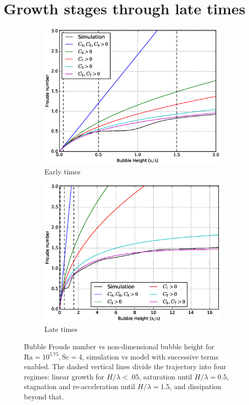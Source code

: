 \section{Growth stages through late times}

\begin{figure}
\begin{subfigure}[b]{\columnwidth}
\includegraphics[width=\columnwidth]{figs/Cascade-short-4-1}
\caption{Early times}
\end{subfigure}
\begin{subfigure}[b]{\columnwidth}
\includegraphics[width=\columnwidth]{figs/Cascade-4-1}
\caption{Late times}
\end{subfigure}
\caption{ 
Bubble Froude number vs non-dimensional bubble height for $\text{Ra} = 10^{5.75}, \text{Sc} = 4$, simulation vs model with successive terms enabled.
The dashed vertical lines divide the trajectory into four regimes: linear growth for $H/\lambda < .05$, saturation until $H / \lambda = 0.5$, stagnation and re-acceleration until $H / \lambda = 1.5$, and dissipation beyond that.
}
\end{figure}

